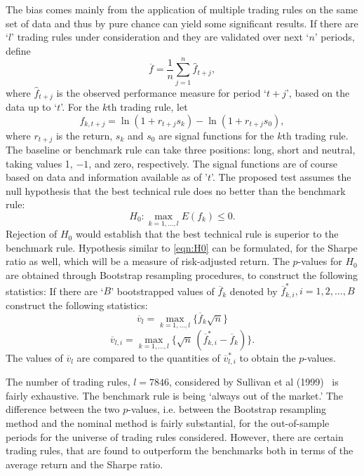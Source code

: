 The bias comes mainly from the application of multiple trading rules on the same set of data and thus by pure chance can yield some significant results. If there are `$l$' trading rules under consideration and they are validated over next `$n$' periods, define
	\begin{equation} \label{eqn:barf}
	\overline{f}= \frac{1}{n} \sum_{j=1}^n\hat{f}_{t+j},
	\end{equation}
where $\hat{f}_{t+j}$ is the observed performance measure for period `$t+j$', based on the data up to `$t$'. For the $k$th trading rule, let
	\begin{equation} \label{eqn:fktj}
	f_{k,t+j}= \ln(1+r_{t+j} s_k) - \ln(1+r_{t+j} s_0),
	\end{equation}
where $r_{t+j}$ is the return, $s_k$ and $s_0$ are signal functions for the $k$th trading rule. The baseline or benchmark rule can take three positions: long, short and neutral, taking values 1, $-1$, and zero, respectively. The signal functions are of course based on data and information available as of '$t$'. The proposed test assumes the null hypothesis that the best technical rule does no better than the benchmark rule:
	\begin{equation} \label{eqn:H0}
	H_0: \max_{k=1,\ldots,l} E(f_k) \leq 0.
	\end{equation}
Rejection of $H_0$ would establish that the best technical rule is superior to the benchmark rule. Hypothesis similar to \eqref{eqn:H0} can be formulated, for the Sharpe ratio as well, which will be a measure of risk-adjusted return. The $p$-values for $H_0$ are obtained through Bootstrap resampling procedures, to construct the following statistics:
If there are `$B$' bootstrapped values of $\overline{f}_k$ denoted by $\overline{f}_{k,i}^*, i=1,2,\ldots,B$ construct the following statistics:
	\begin{equation} \label{eqn:linev}
	\overline{v}_l = \max_{k=1,\ldots,l} \{ \overline{f}_k \sqrt{n} \}
	\end{equation}
	\begin{equation} \label{eqn:linevli}
	\overline{v}_{l,i} = \max_{k=1,\ldots,l} \{\sqrt{n}\,(\overline{f}_{k,i}^* - \overline{f}_k) \}.
	\end{equation}
The values of $\overline{v}_l$ are compared to the quantities of $\overline{v}_{l,i}^*$ to obtain the $p$-values.


The number of trading rules, $l=7846$, considered by Sullivan et al (1999)~\cite{sullivan1999data} is fairly exhaustive. The benchmark rule is being `always out of the market.' The difference between the two $p$-values, i.e. between the Bootstrap resampling method and the nominal method is fairly substantial, for the out-of-sample periods for the universe of trading rules considered. However, there are certain trading rules, that are found to outperform the benchmarks both in terms of the average return and the Sharpe ratio.



